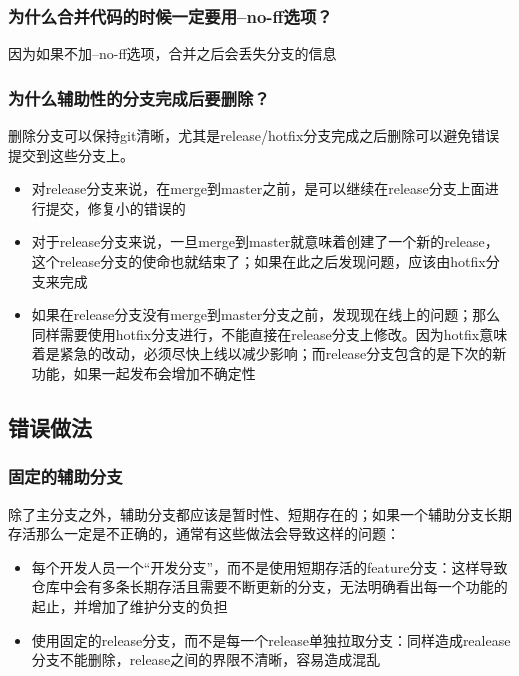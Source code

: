\documentclass[12pt]{article}
\begin{document}
\subsubsection{为什么合并代码的时候一定要用--no-ff选项？}\label{ux4e3aux4ec0ux4e48ux5408ux5e76ux4ee3ux7801ux7684ux65f6ux5019ux4e00ux5b9aux8981ux7528no-ffux9009ux9879}

因为如果不加--no-ff选项，合并之后会丢失分支的信息

\subsubsection{为什么辅助性的分支完成后要删除？}\label{ux4e3aux4ec0ux4e48ux8f85ux52a9ux6027ux7684ux5206ux652fux5b8cux6210ux540eux8981ux5220ux9664}

删除分支可以保持git清晰，尤其是release/hotfix分支完成之后删除可以避免错误提交到这些分支上。

\begin{itemize}
\tightlist
\item
  对release分支来说，在merge到master之前，是可以继续在release分支上面进行提交，修复小的错误的
\item
  对于release分支来说，一旦merge到master就意味着创建了一个新的release，这个release分支的使命也就结束了；如果在此之后发现问题，应该由hotfix分支来完成
\item
  如果在release分支没有merge到master分支之前，发现现在线上的问题；那么同样需要使用hotfix分支进行，不能直接在release分支上修改。因为hotfix意味着是紧急的改动，必须尽快上线以减少影响；而release分支包含的是下次的新功能，如果一起发布会增加不确定性
\end{itemize}

\subsection{错误做法}\label{ux9519ux8befux505aux6cd5}

\subsubsection{固定的辅助分支}\label{ux56faux5b9aux7684ux8f85ux52a9ux5206ux652f}

除了主分支之外，辅助分支都应该是暂时性、短期存在的；如果一个辅助分支长期存活那么一定是不正确的，通常有这些做法会导致这样的问题：

\begin{itemize}
\tightlist
\item
  每个开发人员一个``开发分支''，而不是使用短期存活的feature分支：这样导致仓库中会有多条长期存活且需要不断更新的分支，无法明确看出每一个功能的起止，并增加了维护分支的负担
\item
  使用固定的release分支，而不是每一个release单独拉取分支：同样造成realease分支不能删除，release之间的界限不清晰，容易造成混乱
\end{itemize}
\end{document}
